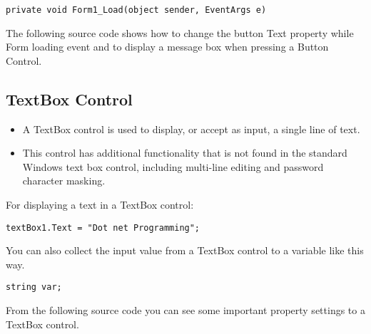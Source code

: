 \begin{lstlisting}[numbers=none]
	private void Form1_Load(object sender, EventArgs e)
\end{lstlisting}

The following {\cs} source code shows how to change the button Text property while Form loading event and to display a message box when pressing a Button Control.




\subsection{TextBox Control}
\begin{itemize}
	\item A TextBox control is used to display, or accept as input, a single line of text. 
	\item This control has additional functionality that is not found in the standard Windows text box control, including multi-line editing and password character masking.
\end{itemize}



For displaying a text in a TextBox control:
\begin{lstlisting}[numbers=none]
	textBox1.Text = "Dot net Programming";
\end{lstlisting}	

You can also collect the input value from a TextBox control to a variable like this way.	
\begin{lstlisting}[numbers=none]
	string var;
\end{lstlisting}

From the following {\cs} source code you can see some important property settings to a TextBox control.



